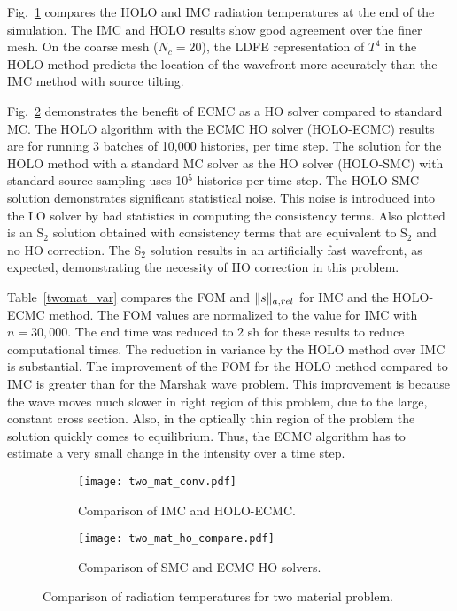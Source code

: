 Fig.~\ref{twomat_full} compares the HOLO and IMC radiation 
temperatures at the end of the simulation. The
IMC and HOLO results show good agreement
over the finer mesh.
On the coarse mesh ($N_c=20$), the LDFE representation of $T^4$ in the HOLO method predicts the location of the
wavefront more accurately than the IMC method with source tilting.

Fig.~\ref{compare_ho} demonstrates the benefit of ECMC as a HO solver compared to
standard MC.  The HOLO algorithm
with the ECMC HO solver (HOLO-ECMC) results
are for running 3 batches of 10,000 histories, per time step. The solution for the HOLO method with a standard MC solver as the HO solver
(HOLO-SMC) with standard source sampling uses 10$^5$ histories per time step. The HOLO-SMC solution demonstrates significant
statistical noise.  This noise is introduced into the LO solver by bad statistics in
computing the consistency terms. Also
plotted is an S$_2$ solution obtained with consistency terms that are equivalent
to S$_2$ and no HO correction.  The S$_2$ solution results in an artificially fast
wavefront, as expected, demonstrating the necessity of HO correction in this problem.

Table~\ref{twomat_var} compares the FOM and $\ss$ for IMC and the HOLO-ECMC method.  The FOM
values are normalized to the value for IMC with $n=30,000$.  The end time was reduced
to $2$ sh for these results to reduce computational times. The reduction in variance by
the HOLO method over IMC is substantial. The improvement of the FOM for the HOLO
method compared to IMC is greater than for the
Marshak wave problem.  This improvement is because the wave moves much slower in
right region of this problem, due to
the large, constant cross section.  Also, in the optically thin
region of the problem the solution quickly comes to equilibrium.  Thus, the ECMC
algorithm has to estimate a very small change in the intensity over a time step.  
\begin{figure}[H]
    \centering
\begin{subfigure}{0.65\textwidth}
    \centering
    \texttt{[image: two\_mat\_conv.pdf]}
    \caption{Comparison of IMC and HOLO-ECMC.\label{twomat_full}}
\end{subfigure}    \begin{subfigure}{0.65\textwidth}
\centering
    \texttt{[image: two\_mat\_ho\_compare.pdf]}
    \caption{Comparison of SMC and ECMC HO solvers. \label{compare_ho}}
\end{subfigure}
    \caption{ Comparison of radiation temperatures for two material problem. \label{twomat}}
\end{figure}


